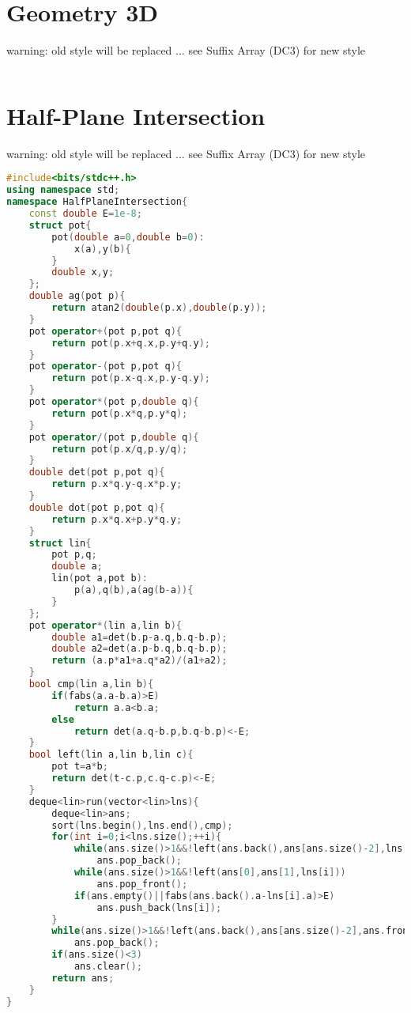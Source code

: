 \documentclass{book}
\begin{document}
\section{Geometry 3D}
warning: old style will be replaced ... see Suffix Array (DC3) for new style\begin{lstlisting}[language=C++,title={Geometry 3D.hpp (0 bytes, 0 lines)}]
\end{lstlisting}
\section{Half-Plane Intersection}
warning: old style will be replaced ... see Suffix Array (DC3) for new style\begin{lstlisting}[language=C++,title={Half-Plane Intersection.hpp (1953 bytes, 71 lines)}]
#include<bits/stdc++.h>
using namespace std;
namespace HalfPlaneIntersection{
    const double E=1e-8;
    struct pot{
        pot(double a=0,double b=0):
            x(a),y(b){
        }
        double x,y;
    };
    double ag(pot p){
        return atan2(double(p.x),double(p.y));
    }
    pot operator+(pot p,pot q){
        return pot(p.x+q.x,p.y+q.y);
    }
    pot operator-(pot p,pot q){
        return pot(p.x-q.x,p.y-q.y);
    }
    pot operator*(pot p,double q){
        return pot(p.x*q,p.y*q);
    }
    pot operator/(pot p,double q){
        return pot(p.x/q,p.y/q);
    }
    double det(pot p,pot q){
        return p.x*q.y-q.x*p.y;
    }
    double dot(pot p,pot q){
        return p.x*q.x+p.y*q.y;
    }
    struct lin{
        pot p,q;
        double a;
        lin(pot a,pot b):
            p(a),q(b),a(ag(b-a)){
        }
    };
    pot operator*(lin a,lin b){
        double a1=det(b.p-a.q,b.q-b.p);
        double a2=det(a.p-b.q,b.q-b.p);
        return (a.p*a1+a.q*a2)/(a1+a2);
    }
    bool cmp(lin a,lin b){
        if(fabs(a.a-b.a)>E)
            return a.a<b.a;
        else
            return det(a.q-b.p,b.q-b.p)<-E;
    }
    bool left(lin a,lin b,lin c){
        pot t=a*b;
        return det(t-c.p,c.q-c.p)<-E;
    }
    deque<lin>run(vector<lin>lns){
        deque<lin>ans;
        sort(lns.begin(),lns.end(),cmp);
        for(int i=0;i<lns.size();++i){
            while(ans.size()>1&&!left(ans.back(),ans[ans.size()-2],lns[i]))
                ans.pop_back();
            while(ans.size()>1&&!left(ans[0],ans[1],lns[i]))
                ans.pop_front();
            if(ans.empty()||fabs(ans.back().a-lns[i].a)>E)
                ans.push_back(lns[i]);
        }
        while(ans.size()>1&&!left(ans.back(),ans[ans.size()-2],ans.front()))
            ans.pop_back();
        if(ans.size()<3)
            ans.clear();
        return ans;
    }
}
\end{lstlisting}
\end{document}
